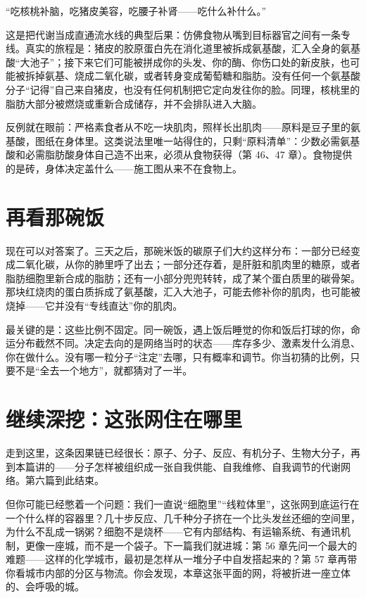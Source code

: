 \begin{wuqu}
“吃核桃补脑，吃猪皮美容，吃腰子补肾——吃什么补什么。”

这是把代谢当成直通流水线的典型后果：仿佛食物从嘴到目标器官之间有一条专线。真实的旅程是：猪皮的胶原蛋白先在消化道里被拆成氨基酸，汇入全身的氨基酸“大池子”；接下来它们可能被拼成你的头发、你的酶、你伤口处的新皮肤，也可能被拆掉氨基、烧成二氧化碳，或者转身变成葡萄糖和脂肪。没有任何一个氨基酸分子“记得”自己来自猪皮，也没有任何机制把它定向发往你的脸。同理，核桃里的脂肪大部分被燃烧或重新合成储存，并不会排队进入大脑。

反例就在眼前：严格素食者从不吃一块肌肉，照样长出肌肉——原料是豆子里的氨基酸，图纸在身体里。这类说法里唯一站得住的，只剩“原料清单”：少数必需氨基酸和必需脂肪酸身体自己造不出来，必须从食物获得（第 46、47 章）。食物提供的是砖，身体决定盖什么——施工图从来不在食物上。
\end{wuqu}

\section{再看那碗饭}

现在可以对答案了。三天之后，那碗米饭的碳原子们大约这样分布：一部分已经变成二氧化碳，从你的肺里呼了出去；一部分还存着，是肝脏和肌肉里的糖原，或者脂肪细胞里新合成的脂肪；还有一小部分兜兜转转，成了某个蛋白质里的碳骨架。那块红烧肉的蛋白质拆成了氨基酸，汇入大池子，可能去修补你的肌肉，也可能被烧掉——它并没有“专线直达”你的肌肉。

最关键的是：这些比例不固定。同一碗饭，遇上饭后睡觉的你和饭后打球的你，命运分布截然不同。决定去向的是网络当时的状态——库存多少、激素发什么消息、你在做什么。没有哪一粒分子“注定”去哪，只有概率和调节。你当初猜的比例，只要不是“全去一个地方”，就都猜对了一半。

\section{继续深挖：这张网住在哪里}

走到这里，这条因果链已经很长：原子、分子、反应、有机分子、生物大分子，再到本篇讲的——分子怎样被组织成一张自我供能、自我维修、自我调节的代谢网络。第六篇到此结束。

但你可能已经憋着一个问题：我们一直说“细胞里”“线粒体里”，这张网到底运行在一个什么样的容器里？几十步反应、几千种分子挤在一个比头发丝还细的空间里，为什么不乱成一锅粥？细胞不是烧杯——它有内部结构、有运输系统、有通讯机制，更像一座城，而不是一个袋子。下一篇我们就进城：第 56 章先问一个最大的难题——这样的化学城市，最初是怎样从一堆分子中自发搭起来的？第 57 章再带你看城市内部的分区与物流。你会发现，本章这张平面的网，将被折进一座立体的、会呼吸的城。

